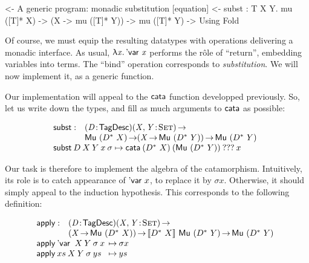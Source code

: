 \begin{wstructure}
<- A generic program: monadic substitution [equation]
    <- subst : \forall T X Y. mu ([T]* X) -> (X -> mu ([T]* Y)) -> mu ([T]* Y)
        -> Using Fold
\end{wstructure}

Of course, we must equip the resulting datatypes with operations
delivering a monadic interface. As usual, \(\LAM{\x}\DVar{\x}\)
performs the r\^ole of ``return'', embedding variables into terms. The
``bind'' operation corresponds to \emph{substitution}. We will now
implement it, as a generic function.

Our implementation will appeal to the $\cata$ function developped
previously. So, let us write down the types, and fill as much
arguments to $\cata$ as possible:

\newcommand{\subst}{\F{subst}}
\newcommand{\apply}{\F{apply}}


\[\stk{
\begin{array}{@{}ll}
\subst : & \PITEL{\V{D}}{\TagDesc}
           \PI{\V{X}, \V{Y}}{\Set} \\
         & \Mu{(\FreeMonad{D}{X})} \To
           (\V{X} \To \Mu{(\FreeMonad{D}{Y})}) \To
           \Mu{(\FreeMonad{D}{Y})} 
\end{array} \\
\subst\: D\: X\: Y\: x\: \sigma \mapsto
  \cata\: (\FreeMonad{D}{X})\: (\Mu{(\FreeMonad{D}{Y})})\: ???\: x
}\]

Our task is therefore to implement the algebra of the
catamorphism. Intuitively, its role is to catch appearance of
$\DVar{x}$, to replace it by $\sigma x$. Otherwise, it should simply
appeal to the induction hypothesis. This corresponds to the following
definition:


\[\stk{
\begin{array}{@{}ll}
\apply : & \PITEL{\V{D}}{\TagDesc} 
           \PI{\V{X}, \V{Y}}{\Set} \\
         & (\V{X} \To \Mu{(\FreeMonad{D}{X})}) \To
           \descop{\FreeMonad{D}{X}}{\Mu{(\FreeMonad{D}{Y})}} \To
           \Mu{(\FreeMonad{D}{Y})}                            \\
\end{array} \\
\begin{array}{@{}l@{\:\:\mapsto\:}l}
\apply\: \DVar{}\: X\: Y\: \sigma\: x  & \sigma x     \\
\apply\: xs\:      X\: Y\: \sigma\: ys & ys
\end{array}
}\]

